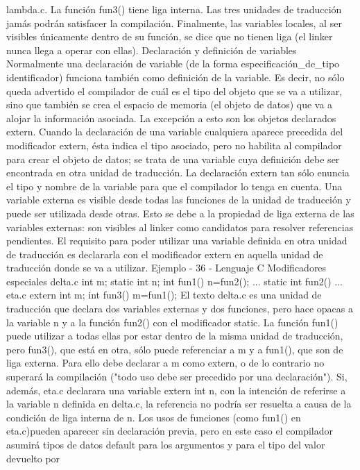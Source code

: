 lambda.c. La función fun3() tiene liga interna. Las tres unidades de traducción jamás podrán
satisfacer la compilación.
Finalmente, las variables locales, al ser visibles únicamente dentro de su función, se dice que no
tienen liga (el linker nunca llega a operar con ellas).
Declaración y definición de variables
Normalmente una declaración de variable (de la forma especificación_de_tipo identificador) funciona
también como definición de la variable. Es decir, no sólo queda advertido el compilador de cuál es el
tipo del objeto que se va a utilizar, sino que también se crea el espacio de memoria (el objeto de datos)
que va a alojar la información asociada.
La excepción a esto son los objetos declarados extern. Cuando la declaración de una variable
cualquiera aparece precedida del modificador extern, ésta indica el tipo asociado, pero no habilita al
compilador para crear el objeto de datos; se trata de una variable cuya definición debe ser encontrada
en otra unidad de traducción. La declaración extern tan sólo enuncia el tipo y nombre de la variable
para que el compilador lo tenga en cuenta.
Una variable externa es visible desde todas las funciones de la unidad de traducción y puede ser
utilizada desde otras. Esto se debe a la propiedad de liga externa de las variables externas: son visibles
al linker como candidatos para resolver referencias pendientes.
El requisito para poder utilizar una variable definida en otra unidad de traducción es declararla con el
modificador extern en aquella unidad de traducción donde se va a utilizar.
Ejemplo
- 36 -
Lenguaje C
Modificadores especiales
delta.c
int m;
static int n;
int fun1()
{
n=fun2();
...
}
static int fun2()
{
...
eta.c
extern int m;
int fun3()
{
m=fun1();
}
}
El texto delta.c es una unidad de traducción que declara dos variables externas y dos funciones, pero
hace opacas a la variable n y a la función fun2() con el modificador static. La función fun1() puede
utilizar a todas ellas por estar dentro de la misma unidad de traducción, pero fun3(), que está en otra,
sólo puede referenciar a m y a fun1(), que son de liga externa. Para ello debe declarar a m como
extern, o de lo contrario no superará la compilación ("todo uso debe ser precedido por una
declaración").
Si, además, eta.c declarara una variable extern int n, con la intención de referirse a la variable n
definida en delta.c, la referencia no podría ser resuelta a causa de la condición de liga interna de n.
Los usos de funciones (como fun1() en eta.c)pueden aparecer sin declaración previa, pero en este caso
el compilador asumirá tipos de datos default para los argumentos y para el tipo del valor devuelto por
